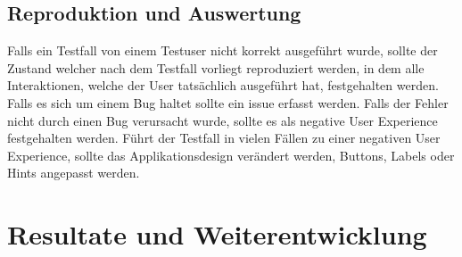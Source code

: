 \subsection{Reproduktion und Auswertung}
Falls ein Testfall von einem Testuser nicht korrekt ausgef\"uhrt wurde, sollte der Zustand welcher nach dem Testfall vorliegt reproduziert werden, in dem alle Interaktionen, welche der User tats\"achlich ausgef\"uhrt hat, festgehalten werden. Falls es sich um einem Bug haltet sollte ein issue erfasst werden. Falls der Fehler nicht durch einen Bug verursacht wurde, sollte es als negative User Experience festgehalten werden. F\"uhrt der Testfall in vielen F\"allen zu einer negativen User Experience, sollte das Applikationsdesign ver\"andert werden, Buttons, Labels oder Hints angepasst werden.

\pagebreak
\section{Resultate und Weiterentwicklung}
